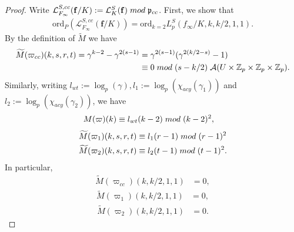 \documentclass[reqno,10pt]{amsart}
\newcommand{\zp}{\mathbb{Z}_{p}}
\newcommand{\f}{\mathbf{f}}
\newcommand{\mcL}{\mathcal{L}}
\theoremstyle{plain}
\theoremstyle{definition}
\begin{document}
\begin{proof}
     Write $\mcL_{F_\infty}^{S,cc}(\f/K) := \mcL_K^S(\f) \hspace{1mm} mod \hspace{1mm} \mathfrak{p}_{cc}$. First, we show that 
     \begin{align*}
         \mathrm{ord}_P(\mcL_{F_\infty}^{S,cc}(\f/K)) = \mathrm{ord}_{k=2} L_p^S(f_\infty/K,k,k/2,1,1). 
     \end{align*}
      By the definition of $\widetilde{M}$ we have
    \begin{align*}
        \widetilde{M}(\varpi_{cc})(k,s,r,t) = \gamma^{k-2} - \gamma^{2(s-1)} & = \gamma^{2(s-1)} (\gamma^{2(k/2-s)}-1) \\
        & \equiv 0 \hspace{1mm} mod \hspace{1mm} (s-k/2) \hspace{1mm} \mathcal{A}(U \times \zp \times \zp \times \zp).
    \end{align*}
    Similarly, writing $l_{wt} := \log_p(\gamma), l_1 := \log_p(\chi_{acy}(\gamma_1))$ and $l_2 := \log_p(\chi_{acy}(\gamma_2))$, we have
    \begin{align} \label{value of M at varpi wt}
        M(\varpi)(k) & \equiv l_{wt}(k-2) \hspace{1mm} mod \hspace{1mm} (k-2)^2,
    \end{align}
    \begin{align*} 
        \widetilde{M}(\varpi_1)(k,s,r,t) & \equiv l_1(r-1) \hspace{1mm} mod \hspace{1mm} (r-1)^2 \\
        \widetilde{M}(\varpi_2)(k,s,r,t) & \equiv l_2(t-1) \hspace{1mm} mod \hspace{1mm} (t-1)^2. 
    \end{align*}
    In particular, 
    \begin{align} \label{value of M at varpi cc}
         \widetilde{M}(\varpi_{cc})(k,k/2,1,1) & = 0,  
    \end{align}
    \begin{align} \label{value of M at varpi 1}
        \widetilde{M}(\varpi_1)(k,k/2,1,1) & = 0,
    \end{align}
    \begin{align} \label{value of M at varpi 2}
        \widetilde{M}(\varpi_2)(k,k/2,1,1) & = 0.
    \end{align}

\end{proof}
\end{document}
